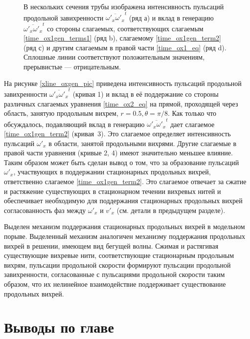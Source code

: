 \begin{figure}[h!]
\caption{В нескольких сечения трубы изображена интенсивность пульсаций продольной завихренности $\overline{\omega'_x \omega'_x}^t$ (ряд а) и вклад в генерацию $\overline{\omega'_x \omega'_x}^t$ со стороны слагаемых, соответствующих слагаемым \eqref{time_ox1gen_terms1} (ряд b), слагаемому \eqref{time_ox1gen_term2} (ряд с) и другим слагаемым в правой части \eqref{time_ox1_eq} (ряд d). Сплошные линии соответствуют положительным значениям, прерывистые --- отрицательным.}
\label{mp_ox1gen_pic}
\end{figure}


На рисунке \ref{xline_oxgen_pic} приведена интенсивность пульсаций продольной завихренности $\overline{\omega'_x \omega'_x}^t$ (кривая 1) и вклад в её поддержание со стороны различных слагаемых уравнения \eqref{time_ox2_eq} на прямой, проходящей через область, занятую продольным вихрем, $r = 0.5, \theta = \pi/8$. Как только что обсуждалось, подавляющий вклад в генерацию $\overline{\omega'_x \omega'_x}^t$ дает слагаемое \eqref{time_ox1gen_term2} (кривая~3). Это слагаемое определяет интенсивность пульсаций $\omega'_x$ в области, занятой продольными вихрями. Другие слагаемые в правой части уравнения (кривые 2, 4) имеют значительно меньшее влияние. Таким образом может быть сделан вывод о том, что за образование пульсаций $\omega'_x$, участвующих в поддержании стационарных продольных вихрей, ответственно слагаемое \eqref{time_ox1gen_term2}. Это слагаемое отвечает за сжатие и растяжение существующих в стационарном течении вихревых нитей и обеспечивает необходимую для поддержания стационарных продольных вихрей согласованность фаз между $\omega'_x$ и $v'_x$ (см. детали в предыдущем разделе). 

Выделен механизм поддержания стационарных продольных вихрей в модельном порыве. Выделенный механизм аналогичен механизму поддержания продольных вихрей в решении, имеющем вид бегущей волны. Сжимая и растягивая существующие вихревые нити, соответствующие стационарным продольным вихрям, пульсации продольной скорости формируют пульсации продольной завихренности, согласованные с пульсациями продольной скорости таким образом, что их нелинейное взаимодействие поддерживает существование продольных вихрей. 


\section{Выводы по главе}


